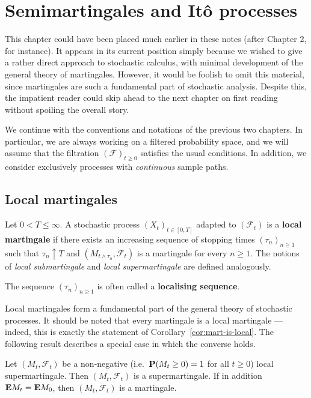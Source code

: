 \section{Semimartingales and It\^{o} processes}

This chapter could have been placed much earlier in these notes (after Chapter 2, for instance). It appears in its current position simply because we wished to give a rather direct approach to stochastic calculus, with minimal development of the general theory of martingales. However, it would be foolish to omit this material, since martingales are such a fundamental part of stochastic analysis. Despite this, the impatient reader could skip ahead to the next chapter on first reading without spoiling the overall story.

We continue with the conventions and notations of the previous two chapters. In particular, we are always working on a filtered probability space, and we will assume that the filtration $(\mathcal{F})_{t\ge 0}$ satisfies the usual conditions. In addition, we consider exclusively processes with \emph{continuous} sample paths.

\subsection{Local martingales}

\begin{definition}
	Let $0<T\le\infty$. A stochastic process $(X_t)_{t\in [0,T]}$ adapted to $(\mathcal{F}_t)$ is a \textbf{local martingale} if there exists an increasing sequence of stopping times $(\tau_n)_{n\ge 1}$ such that $\tau_n \uparrow T$ and $(M_{t\wedge\tau_n}, \mathcal{F}_t)$ is a martingale for every $n\ge 1$. The notions of \emph{local submartingale} and \emph{local supermartingale} are defined analogously.
	
	The sequence $(\tau_n)_{n\ge 1}$ is often called a \textbf{localising sequence}.
\end{definition}

Local martingales form a fundamental part of the general theory of stochastic processes. It should be noted that every martingale is a local martingale --- indeed, this is exactly the statement of Corollary~\ref{cor:mart-is-local}. The following result describes a special case in which the converse holds.

\begin{theorem}
	\label{thm:non-neg-loc-mart}
	Let $(M_t, \mathcal{F}_t)$ be a non-negative (i.e.\ $\mathbf{P}(M_t\ge 0) = 1$ for all $t\ge 0$) local supermartingale. Then $(M_t, \mathcal{F}_t)$ is a supermartingale. If in addition $\mathbf{E} M_t = \mathbf{E} M_0$, then $(M_t, \mathcal{F}_t)$ is a martingale.
\end{theorem}

